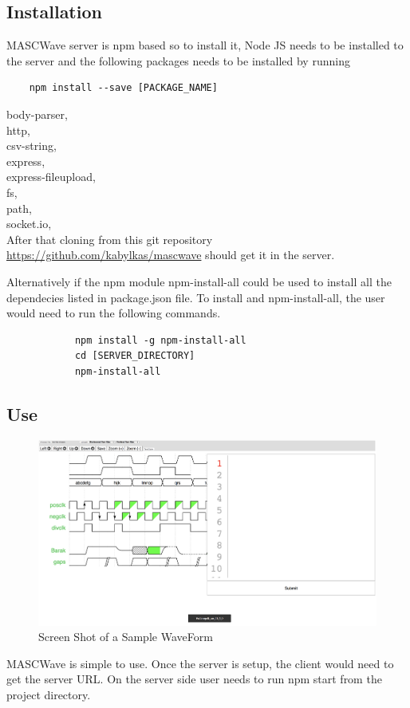 \documentclass[14pt]{extarticle}
\begin{document}
\subsection{Installation}
 	MASCWave server is npm based so to install it, Node JS needs to be installed to the server and the following packages needs to be installed by running 
 
 \begin{verbatim}
 	npm install --save [PACKAGE_NAME]
\end{verbatim}	
    \textendash body-parser,\\
    \textendash http,\\
    \textendash csv-string,\\
    \textendash express,\\
    \textendash express-fileupload,\\
    \textendash fs,\\
    \textendash path,\\
    \textendash socket.io,\\
 After that cloning from this git repository \url{https://github.com/kabylkas/mascwave} should get it in the server.
 
 \par Alternatively if the npm module npm-install-all could be used to install all the dependecies listed in package.json file. To install and npm-install-all, the user would need to run the following commands.
 
 \begin{verbatim}
            npm install -g npm-install-all
            cd [SERVER_DIRECTORY]
            npm-install-all
\end{verbatim}

    
\subsection{Use}
\begin{figure}[H]
    \centering
    \includegraphics[scale=0.3]{tutorial}
    \caption{Screen Shot of a Sample WaveForm}
    \label{fig:tutorial}
\end{figure}
 MASCWave is simple to use. Once the server is setup, the client would need to get the server URL. On the server side user needs to run npm start from the project directory.
\end{document}

